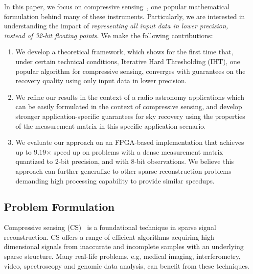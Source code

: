 \documentclass{article}
\begin{document}
In this paper, we focus on compressive sensing~\cite{donoho2006cs, candes2006cs, candes2006cs2}, one popular mathematical formulation behind many of these instruments. Particularly, we are interested in understanding
the impact of {\em representing all input data
in lower precision, instead of 32-bit floating points}. 
We make the following contributions:

\begin{enumerate}
\item We develop a theoretical framework, which shows for the first time that, under certain
technical conditions, Iterative Hard Thresholding (IHT),
one popular algorithm for compressive sensing,  converges
with guarantees on the recovery quality using only 
input data in lower precision.
\item We refine our results in the context of a radio
astronomy applications which can be easily formulated in
the context of compressive sensing, 
and develop {stronger} application-specific 
guarantees for sky recovery using the properties of the measurement matrix in this specific application
scenario. 
\item We evaluate our approach on an FPGA-based
implementation that achieves up to 9.19$\times$ speed up 
on problems with a dense measurement matrix quantized to 2-bit precision, and with 8-bit observations.
We believe this approach can further generalize to other sparse reconstruction problems demanding high processing capability to provide similar
speedups.
\end{enumerate}




\subsection{Problem Formulation}
Compressive sensing (CS)~\cite{donoho2006cs, candes2006cs, candes2006cs2} is a foundational technique in sparse signal reconstruction. CS offers a range of efficient algorithms acquiring high dimensional signals from inaccurate and incomplete samples with an underlying sparse structure. 
Many real-life problems, e.g, medical imaging, interferometry, video, spectroscopy and genomic data analysis, can benefit from these techniques.
\end{document}
